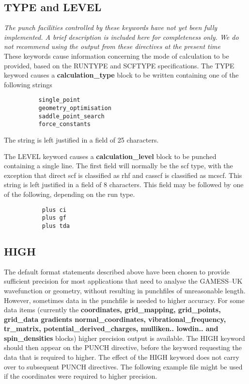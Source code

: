 \documentclass[11pt,fleqn]{article}
\begin{document}
\subsection[TYPE and LEVEL]{TYPE and LEVEL}

{\em The punch facilities controlled by these keywords have not yet been fully
implemented. A brief description is included here for completeness only. We
do not recommend using the output from these directives at the present time} \\

These keywords cause information concerning the mode of calculation to be
provided, based on the RUNTYPE and SCFTYPE specifications.
The TYPE keyword causes a {\bf calculation\_type} block
to be written containing one of the following strings 

{
\footnotesize
\begin{verbatim}
          single_point
          geometry_optimisation
          saddle_point_search
          force_constants
\end{verbatim}
}
The string is left justified in a field of 25 characters.

The LEVEL keyword causes a {\bf calculation\_level} block
to be punched containing a single line. The first field 
will normally be the scf type, with the exception that direct scf is 
classified as rhf and casscf is classified as mcscf.
This string is left justified in a field of 8 characters.
This field may be followed by one of the following, depending
on the run type.

{
\footnotesize
\begin{verbatim}
           plus ci
           plus gf
           plus tda
\end{verbatim}
}

\subsection[HIGH]{HIGH}
 
The default format statements described above have been chosen 
to provide sufficient precision for most applications that need
to analyse the GAMESS--UK wavefunction or geometry, without resulting in
punchfiles of unreasonable length.  However, sometimes
data in the punchfile is needed to higher accuracy. For some data
items (currently the {\bf coordinates, grid\_mapping, grid\_points, 
grid\_data gradients normal\_coordinates, vibrational\_frequency,
tr\_matrix, potential\_derived\_charges, mulliken.. lowdin.. 
and spin\_densities} blocks) higher precision output is 
available. The HIGH keyword should then appear on the PUNCH directive,
before the keyword requesting the data that is required to higher.
The effect of the HIGH keyword does not carry over to subsequent
PUNCH directives. The following example file might be used if the
coordinates were required to higher precision.
\end{document}
